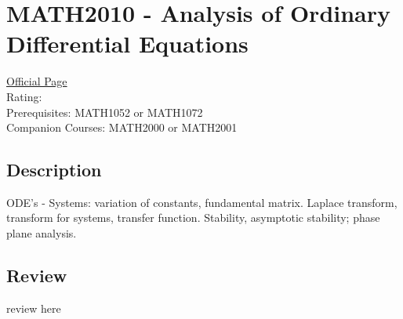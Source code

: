 \hypertarget{MATH2010}{\section{MATH2010 - Analysis of Ordinary Differential Equations}}

\large
\textcolor{turbo_purple}{\href{https://my.uq.edu.au/programs-courses/course.html?course_code=MATH2010}{Official Page}} \\
Rating: \cstar\cstar\cstar\cstar\ostar \\
Prerequisites: MATH1052 or MATH1072 \\
Companion Courses: MATH2000 or MATH2001

\normalsize
\subsection*{Description}
ODE's - Systems: variation of constants, fundamental matrix.
Laplace transform, transform for systems, transfer function.
Stability, asymptotic stability; phase plane analysis.

\subsection*{Review}
review here
